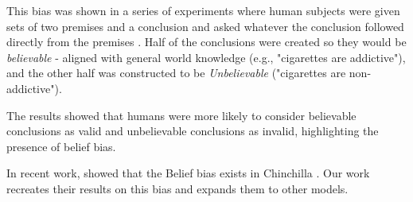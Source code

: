 This bias was shown in a series of experiments where human subjects were given sets of two premises and a conclusion and asked whatever the conclusion followed directly from the premises \cite{evans1983conflict}.
Half of the conclusions were created so they would be \textit{believable} - aligned with general world knowledge (e.g., "cigarettes are addictive"), and the other half was constructed to be \textit{Unbelievable} ("cigarettes are non-addictive").

The results showed that humans were more likely to consider believable conclusions as valid and unbelievable conclusions as invalid, highlighting the presence of belief bias.

In recent work, \citet{dasgupta2022language} showed that the Belief bias exists in Chinchilla  \citep{hoffmann2022training}.
Our work recreates their results on this bias and expands them to other models.


